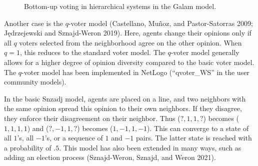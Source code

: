 \documentclass[
  a4paper,
  DIV=11,
  numbers=noendperiod,
  oneside]{scrreprt}
\begin{document}
\begin{figure}


\caption{\label{fig-ch7-img5-old-93}Bottom-up voting in hierarchical
systems in the Galam model.}

\end{figure}%

Another case is the \(q\)-voter model (Castellano, Muñoz, and
Pastor-Satorras 2009; Jędrzejewski and Sznajd-Weron 2019). Here, agents
change their opinions only if all \(q\) voters selected from the
neighborhood agree on the other opinion. When \(q = 1\), this reduces to
the standard voter model. The \(q\)-voter model generally allows for a
higher degree of opinion diversity compared to the basic voter model.
The \(q\)-voter model has been implemented in NetLogo (``qvoter\_WS'' in
the user community models).

In the basic Snzadj model, agents are placed on a line, and two
neighbors with the same opinion spread this opinion to their own
neighbors. If they disagree, they enforce their disagreement on their
neighbor. Thus (\(?,1,1,?\)) becomes (\(1,1,1,1\)) and (\(?,-1,1,?\))
becomes (\(1,-1,1,-1\)). This can converge to a state of all \(1\)'s,
all \(-1\)'s, or a sequence of \(1\) and \(-1\) pairs. The latter state
is reached with a probability of \(.5\). This model has also been
extended in many ways, such as adding an election process (Sznajd-Weron,
Sznajd, and Weron 2021).
\end{document}
